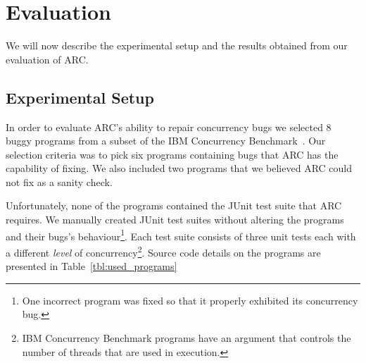 \section{Evaluation}
\label{sec:experiments}

We will now describe the experimental setup and the results obtained from our evaluation of ARC.


\subsection{Experimental Setup}
\label{sec:experimental_setup}

In order to evaluate ARC's ability to repair concurrency bugs we selected 8 buggy programs from a subset of the IBM Concurrency Benchmark~\cite{EHSU06}. Our selection
criteria was to pick six programs containing bugs that ARC has the
capability of fixing. We also included two programs that we believed ARC could not fix as a sanity check.

Unfortunately, none of the programs contained the JUnit test suite that ARC
requires. We manually created JUnit test suites without altering the programs
and their bugs's behaviour\footnote{One incorrect program was fixed so that it
properly exhibited its concurrency bug.}. Each test suite consists of three
unit tests each with a different \textit{level} of concurrency\footnote{IBM
Concurrency Benchmark programs have an argument that controls the number of
threads that are used in execution.}. Source code details on the programs are
presented in Table~\ref{tbl:used_programs}


